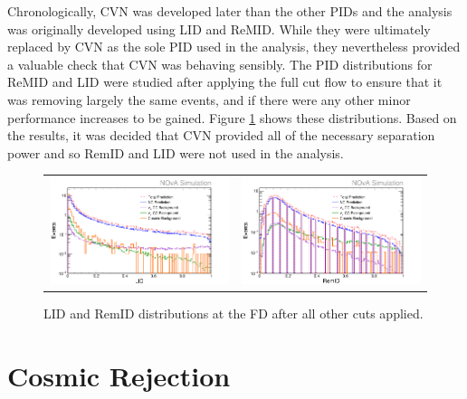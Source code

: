 Chronologically, CVN was developed later than the other PIDs and the analysis was originally developed using LID and ReMID. While they were ultimately replaced by CVN as the sole PID used in the analysis, they nevertheless provided a valuable check that CVN was behaving sensibly. The PID distributions for ReMID and LID were studied after applying the full cut flow to ensure that it was removing largely the same events, and if there were any other minor performance increases to be gained. Figure \ref{fig:NM1NCSel} shows these distributions. Based on the results, it was decided that CVN provided all of the necessary separation power and so RemID and LID were not used in the analysis.
\begin{figure}[htb]
  \centering
  \begin{tabular}{c c}
    \includegraphics[width=.47\textwidth]{figures/SelNP1/NM1ELID.png} &
    \includegraphics[width=.47\textwidth]{figures/SelNP1/NM1RmID.png} \\
  \end{tabular}
  \caption[LID and RemID Distributions at the FD]{LID and RemID distributions at the FD after all other cuts applied.}
  \label{fig:NM1NCSel}
\end{figure}

\section{Cosmic Rejection}

